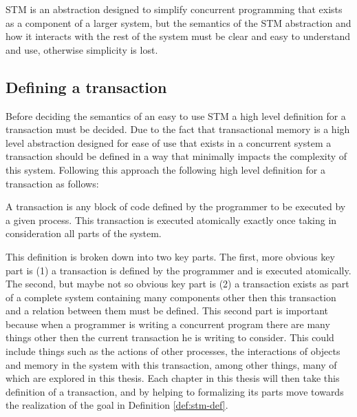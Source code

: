 \begin{definition}\label{def:stm-def}
STM is an abstraction designed to simplify concurrent programming that exists as a component of a larger system,
but the semantics of the STM abstraction and how it interacts with the rest of the system must be clear and easy to understand and use,
otherwise simplicity is lost.
\end{definition}

\subsection{Defining a transaction}
Before deciding the semantics of an easy to use STM a high level
definition for a transaction must be decided.
Due to the fact that transactional memory is a high level abstraction designed for ease of use
that exists in a concurrent system
a transaction should be defined in a way that minimally impacts the complexity
of this system.
Following this approach the following high level definition for a transaction as follows:

\begin{definition}\label{def:trans-def}
A transaction is any block of
code defined by the programmer to be executed by a given process.
This transaction is executed atomically exactly once
taking in consideration all parts of the system.
\end{definition}

This definition is broken down into two key parts.
The first, more obvious key part is (1) a transaction is defined by the programmer
and is executed atomically.
The second, but maybe not so obvious key part is (2) a transaction exists
as part of a complete system containing many components other then this transaction and a relation between them must be
defined.
This second part is important because when a programmer is writing a concurrent program there are many things
other then the current transaction he is writing to consider.
This could include things such as the actions of other processes, the interactions
of objects and memory in the system with this transaction, among other things, many of
which are explored in this thesis.
Each chapter in this thesis will then take this definition of a transaction,
and by helping to formalizing its parts move towards the realization of the
goal in Definition \ref{def:stm-def}.


